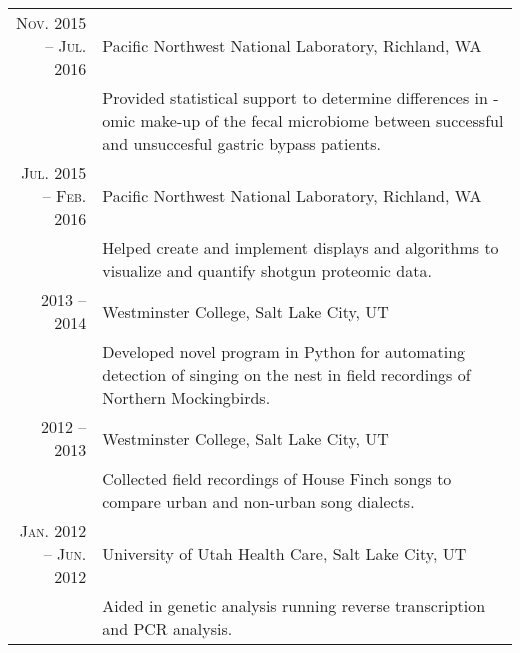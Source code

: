 \documentclass[a4paper,10pt]{report}
\begin{document}
\begin{longtable}{rp{10cm}}
	\textsc{Nov. 2015 -- Jul. 2016}  & Pacific Northwest National Laboratory, Richland, WA                                           \\
	                                 & \footnotesize{Provided statistical support to determine differences in -omic
		make-up of the fecal microbiome between successful and
	unsuccesful gastric bypass patients.}                                                                                            \\
	\textsc{Jul. 2015 -- Feb. 2016}  & Pacific Northwest National Laboratory, Richland, WA                                           \\
	                                 & \footnotesize{Helped create and implement displays and algorithms to visualize
	and quantify shotgun proteomic data.}                                                                                            \\
	\textsc{2013 -- 2014}            & Westminster College, Salt Lake City, UT                                                       \\
	                                 & \footnotesize{Developed novel program in Python for automating detection of
	singing on the nest in field recordings of Northern Mockingbirds.}                                                               \\
	\textsc{2012 -- 2013}            & Westminster College, Salt Lake City, UT                                                       \\
	                                 & \footnotesize{Collected field recordings of House Finch songs to compare urban
	and non-urban song dialects.}                                                                                                    \\
	\textsc{Jan. 2012 -- Jun. 2012}  & University of Utah Health Care, Salt Lake City, UT
	\\& \footnotesize{Aided in genetic analysis running reverse transcription and PCR analysis.}
\end{longtable}

\end{document}
